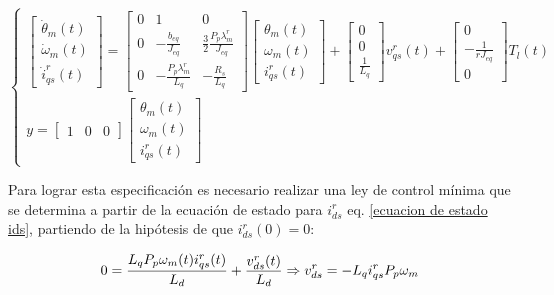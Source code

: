 \documentclass[a4paper, 10pt, onecolumn,journal]{ieeeconf}
\begin{document}
\begin{equation}
	\begin{cases}
		\begin{bmatrix}
			\dot{\theta}_m(t) \\ 
			\dot{\omega}_m(t)\\
			\dot{i}^r_{qs}(t)  
		\end{bmatrix}
		 = 
		 \begin{bmatrix}
		 	0 & 1 & 0\\ 
		 	0 & - \frac{b_{eq}}{J_{eq}} & \frac{3}{2} \frac{P_p \lambda^r_m}{J_{eq}}\\
		 	0 &  - \frac{P_p  \lambda^r_m}{L_q} & -\frac{R_s}{L_q}  
		 \end{bmatrix}
		 \begin{bmatrix}
		 	{\theta}_m(t) \\ 
		 	{\omega}_m(t)\\
		 	{i}^r_{qs}(t)  
		 \end{bmatrix}
		 +
		 \begin{bmatrix}
		 	0 \\ 
		 	0\\
		 	\frac{1}{L_q}  
		 \end{bmatrix}
		 v^r_{qs}(t)+
		 \begin{bmatrix}
		 	0 \\ 
		 	- \frac{1}{r J_{eq}}\\
		 	0 
		 \end{bmatrix}
		 T_l(t)\\
		 y = \begin{bmatrix}
		 		1 & 0 & 0
		 	 \end{bmatrix}
		 	 \begin{bmatrix}
		 	 	{\theta}_m(t) \\ 
		 	 	{\omega}_m(t)\\
		 	 	{i}^r_{qs}(t)
		 	 \end{bmatrix}
	\end{cases}
	\label{ecuacion matricial con ids=0}
\end{equation}

Para lograr esta especificación es necesario realizar una ley de control mínima que se determina a partir de la ecuación de estado para $i^{r}_{ds}$ eq. \eqref{ecuacion de estado ids}, partiendo de la hipótesis de que $i^{r}_{ds}(0)=0$:

\begin{equation}
	0= \frac{L_q P_p \omega_m(t)i^r_{qs}(t)}{L_d}  + \frac{v^r_{ds}(t)}{L_d}\Rightarrow	v^{r}_{ds}= -L_{q}i^{r}_{qs}P_{p}\omega_{m}\\
	\label{ecuacion determinacion ley de control minima}
\end{equation}
\end{document}
